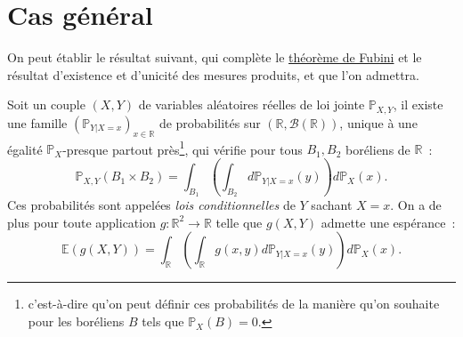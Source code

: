 \section{Cas général}\label{III-cas-guxe9nuxe9ral}

On peut établir le résultat suivant, qui complète le
\href{Probabilité\%20II.pdf\%20\#fubiniproba}{théorème de Fubini} et le
résultat d'existence et d'unicité des mesures produits, et que l'on
admettra.

\begin{theoreme}\label{III-fubinicond}

Soit un couple \((X,Y)\) de variables aléatoires réelles de loi jointe
\(\mathbb{P}_{X,Y}\), il existe une famille
\(\left(\mathbb{P}_{Y|X=x}\right)_{x\in\mathbb{R}}\) de probabilités sur
\((\mathbb{R},\mathcal{B}(\mathbb{R}))\), unique à une égalité
\(\mathbb{P}_X\)-presque partout près\footnote{c'est-à-dire qu'on peut
  définir ces probabilités de la manière qu'on souhaite pour les
  boréliens \(B\) tels que \(\mathbb{P}_X(B)=0\).}, qui vérifie pour
tous \(B_1, B_2\) boréliens de \(\mathbb{R}\)~:
\[ \mathbb{P}_{X,Y}(B_1 \times B_2) = \int_{B_1} \left( \int_{B_2} d\mathbb{P}_{Y|X=x}(y) \right) d\mathbb{P}_X(x).\]
Ces probabilités sont appelées \emph{lois conditionnelles} de \(Y\)
sachant \(X =x\). On a de plus pour toute application
\(g : \mathbb{R}^2 \to \mathbb{R}\) telle que \(g(X,Y)\) admette une
espérance~:
\[\mathbb{E}(g(X,Y)) = \int_\mathbb{R}\left( \int_\mathbb{R}g(x,y)d\mathbb{P}_{Y|X=x}(y) \right) d\mathbb{P}_X(x).\]
\end{theoreme}

